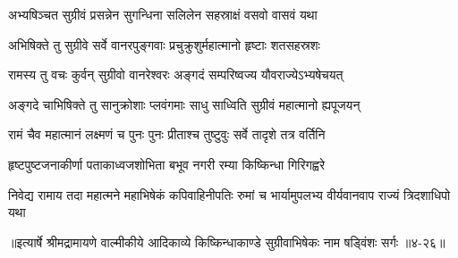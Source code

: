\twolineshloka
{अभ्यषिञ्चत सुग्रीवं प्रसन्नेन सुगन्धिना}
{सलिलेन सहस्राक्षं वसवो वासवं यथा} %

\twolineshloka
{अभिषिक्ते तु सुग्रीवे सर्वे वानरपुङ्गवाः}
{प्रचुक्रुशुर्महात्मानो हृष्टाः शतसहस्रशः} %

\twolineshloka
{रामस्य तु वचः कुर्वन् सुग्रीवो वानरेश्वरः}
{अङ्गदं सम्परिष्वज्य यौवराज्येऽभ्यषेचयत्} %

\twolineshloka
{अङ्गदे चाभिषिक्ते तु सानुक्रोशाः प्लवंगमाः}
{साधु साध्विति सुग्रीवं महात्मानो ह्यपूजयन्} %

\twolineshloka
{रामं चैव महात्मानं लक्ष्मणं च पुनः पुनः}
{प्रीताश्च तुष्टुवुः सर्वे तादृशे तत्र वर्तिनि} %

\twolineshloka
{हृष्टपुष्टजनाकीर्णा पताकाध्वजशोभिता}
{बभूव नगरी रम्या किष्किन्धा गिरिगह्वरे} %

\twolineshloka
{निवेद्य रामाय तदा महात्मने महाभिषेकं कपिवाहिनीपतिः}
{रुमां च भार्यामुपलभ्य वीर्यवानवाप राज्यं त्रिदशाधिपो यथा} %


॥इत्यार्षे श्रीमद्रामायणे वाल्मीकीये आदिकाव्ये किष्किन्धाकाण्डे सुग्रीवाभिषेकः नाम षड्विंशः सर्गः ॥४-२६॥
